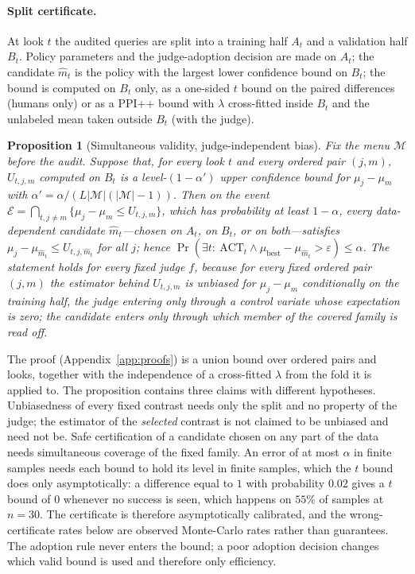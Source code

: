 \documentclass{article}
\newtheorem{proposition}{Proposition}
\newcommand{\eps}{\varepsilon}
\newcommand{\ACT}{\mathrm{ACT}}
\begin{document}
\paragraph{Split certificate.} At look $t$ the audited queries are split into a training half $A_t$ and a validation half $B_t$. Policy parameters and the judge-adoption decision are made on $A_t$; the candidate $\hat m_t$ is the policy with the largest lower confidence bound on $B_t$; the bound is computed on $B_t$ only, as a one-sided $t$ bound on the paired differences (humans only) or as a PPI++ bound with $\lambda$ cross-fitted inside $B_t$ and the unlabeled mean taken outside $B_t$ (with the judge).
\begin{proposition}[Simultaneous validity, judge-independent bias]\label{prop:B}
Fix the menu $\mathcal M$ before the audit. Suppose that, for every look $t$ and every ordered pair $(j,m)$, $U_{t,j,m}$ computed on $B_t$ is a level-$(1-\alpha')$ upper confidence bound for $\mu_j-\mu_m$ with $\alpha'=\alpha/(L|\mathcal M|(|\mathcal M|-1))$. Then on the event $\mathcal E=\bigcap_{t,j\ne m}\{\mu_j-\mu_m\le U_{t,j,m}\}$, which has probability at least $1-\alpha$, every data-dependent candidate $\hat m_t$---chosen on $A_t$, on $B_t$, or on both---satisfies $\mu_j-\mu_{\hat m_t}\le U_{t,j,\hat m_t}$ for all $j$; hence $\Pr(\exists t:\ \ACT_t\wedge\mu_{\mathrm{best}}-\mu_{\hat m_t}>\eps)\le\alpha$. The statement holds for every fixed judge $f$, because for every \emph{fixed} ordered pair $(j,m)$ the estimator behind $U_{t,j,m}$ is unbiased for $\mu_j-\mu_m$ conditionally on the training half, the judge entering only through a control variate whose expectation is zero; the candidate enters only through which member of the covered family is read off.
\end{proposition}
The proof (Appendix~\ref{app:proofs}) is a union bound over ordered pairs and looks, together with the independence of a cross-fitted $\lambda$ from the fold it is applied to. The proposition contains three claims with different hypotheses. Unbiasedness of every fixed contrast needs only the split and no property of the judge; the estimator of the \emph{selected} contrast is not claimed to be unbiased and need not be. Safe certification of a candidate chosen on any part of the data needs simultaneous coverage of the fixed family. An error of at most $\alpha$ in finite samples needs each bound to hold its level in finite samples, which the $t$ bound does only asymptotically: a difference equal to $1$ with probability $0.02$ gives a $t$ bound of $0$ whenever no success is seen, which happens on $55\%$ of samples at $n=30$. The certificate is therefore asymptotically calibrated, and the wrong-certificate rates below are observed Monte-Carlo rates rather than guarantees. The adoption rule never enters the bound; a poor adoption decision changes which valid bound is used and therefore only efficiency.
\end{document}
